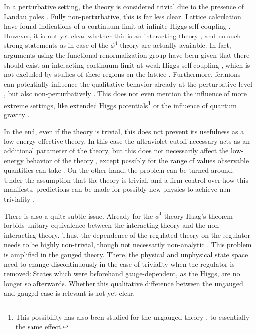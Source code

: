 \documentclass[final,12pt,3p,longtitle]{elsarticle}
\newcommand*{\1}{1\!\!\!\bot}
\begin{document}
In a perturbative setting, the theory is considered trivial due to the presence of Landau poles \cite{Callaway:1988ya}. Fully non-perturbative, this is far less clear. Lattice calculation have found indications of a continuum limit at infinite Higgs self-coupling \cite{Bonati:2009pf}. However, it is not yet clear whether this is an interacting theory \cite{Dashen:1983ts,Fernandez:1992jh}, and no such strong statements as in case of the $\phi^4$ theory \cite{Luscher:1987ay,Luscher:1987ek,Hasenfratz:1988kr,Luscher:1988gc,Luscher:1988uq,Zimmermann:1991xx,Heller:1993yv} are actually available. In fact, arguments using the functional renormalization group have been given that there should exist an interacting continuum limit at weak Higgs self-coupling \cite{Gies:2015lia,Gies:2016kkk}, which is not excluded by studies of these regions on the lattice \cite{Wurtz:2013ova,Maas:2014pba}. Furthermore, fermions can potentially influence the qualitative behavior already at the perturbative level \cite{Callaway:1988ya,Litim:2014uca,Litim:2015iea,Bezrukov:2012sa}, but also non-perturbatively \cite{Gies:2013pma}. This does not even mention the influence of more extreme settings, like extended Higgs potentials\footnote{This possibility has also been studied for the ungauged theory \cite{Gies:2014xha,Chu:2015nha,Borchardt:2016xju}, to essentially the same effect.} \cite{Gies:2017zwf} or the influence of quantum gravity \cite{Dona:2013qba,Eichhorn:2016esv,Eichhorn:2017ylw,Gonzalez-Martin:2017bvw}.

In the end, even if the theory is trivial, this does not prevent its usefulness as a low-energy effective theory. In this case the ultraviolet cutoff necessary acts as an additional parameter of the theory, but this does not necessarily affect the low-energy behavior of the theory \cite{Hasenfratz:1986za}, except possibly for the range of values observable quantities can take \cite{Eichhorn:2015kea}. On the other hand, the problem can be turned around. Under the assumption that the theory is trivial, and a firm control over how this manifests, predictions can be made for possibly new physics to achieve non-triviality \cite{Bezrukov:2012sa,Eichhorn:2017ylw,Christiansen:2017cxa}.

There is also a quite subtle issue. Already for the $\phi^4$ theory Haag's theorem \cite{Haag:1992hx} forbids unitary equivalence between the interacting theory and the non-interacting theory. Thus, the dependence of the regulated theory on the regulator needs to be highly non-trivial, though not necessarily non-analytic \cite{Glimm:1987ng}. This problem is amplified in the gauged theory. There, the physical and unphysical state space need to change discontinuously in the case of triviality when the regulator is removed: States which were beforehand gauge-dependent, as the Higgs, are no longer so afterwards. Whether this qualitative difference between the ungauged and gauged case is relevant is not yet clear.
\end{document}
